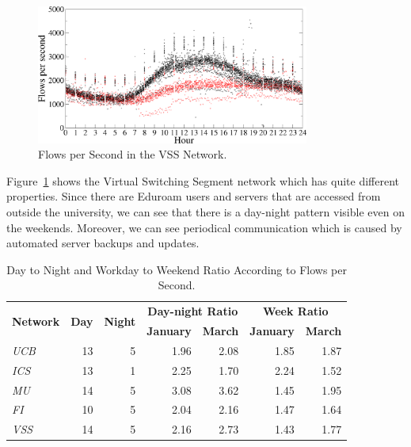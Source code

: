 \begin{figure}[!t]
        \begin{center}
                \includegraphics[width=0.8\textwidth]{figures/paper-characterization/flows-vss-jan}
                \caption{Flows per Second in the VSS Network.} \label{fig:characterization-flows-vss-jan}
        \end{center}
\end{figure}

Figure~\ref{fig:characterization-flows-vss-jan} shows the Virtual Switching Segment network which has quite different properties. Since there are Eduroam users and servers that are accessed from outside the university, we can see that there is a day-night pattern visible even on the weekends. Moreover, we can see periodical communication which is caused by automated server backups and updates.

\begin{table}[!tb]
        \centering
        \renewcommand{\arraystretch}{1.1}
        \begin{tabular}{|l|r|r|r|r|r|r|} \hline
                \multirow{2}{*}{\centering\textbf{Network}}  & \multirow{2}{*}{\centering\textbf{Day}} & \multirow{2}{*}{\centering\textbf{Night}} & \multicolumn{2}{c|}{\textbf{Day-night Ratio}}  & \multicolumn{2}{c|}{\textbf{Week Ratio}}  \\ \cline{4-7}
                & & & \textbf{January} & \textbf{March} & \textbf{January} & \textbf{March} \\ \hline
                \textit{UCB} & 13 & 5 &  1.96 & 2.08 & 1.85  & 1.87 \\ \hline
                \textit{ICS} & 13 & 1 & 2.25  & 1.70 & 2.24 & 1.52 \\ \hline
                \textit{MU} & 14 & 5 & 3.08 & 3.62 & 1.45 & 1.95 \\ \hline
                \textit{FI} & 10 & 5 & 2.04 & 2.16 & 1.47 & 1.64 \\ \hline
                \textit{VSS} & 14 & 5 & 2.16 & 2.73 & 1.43 & 1.77 \\ \hline
        \end{tabular}
        \caption{Day to Night and Workday to Weekend Ratio According to Flows per Second.}
        \label{tab:characterization-day-night-ratio}
\end{table}

